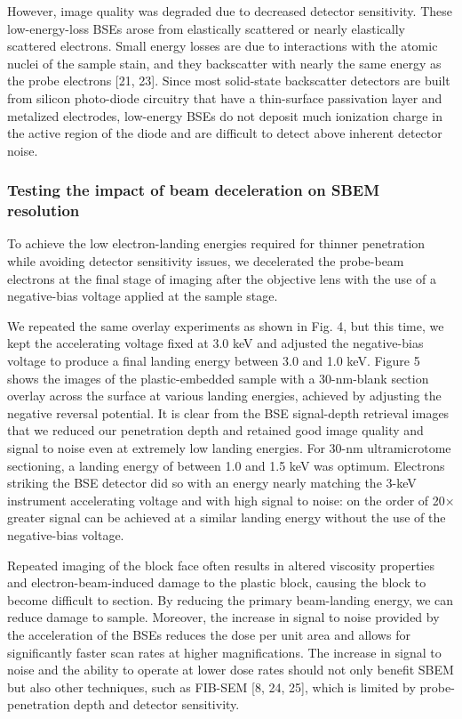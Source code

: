 \documentclass{article}
\begin{document}
However, image quality was degraded due to decreased detector sensitivity. These low-energy-loss BSEs arose from elastically scattered or nearly elastically scattered electrons. Small energy losses are due to interactions with the atomic nuclei of the sample stain, and they backscatter with nearly the same energy as the probe electrons [21, 23]. Since most solid-state backscatter detectors are built from silicon photo-diode circuitry that have a thin-surface passivation layer and metalized electrodes, low-energy BSEs do not deposit much ionization charge in the active region of the diode and are difficult to detect above inherent detector noise.

\subsubsection*{Testing the impact of beam deceleration on SBEM resolution}
To achieve the low electron-landing energies required for thinner penetration while avoiding detector sensitivity issues, we decelerated the probe-beam electrons at the final stage of imaging after the objective lens with the use of a negative-bias voltage applied at the sample stage.

We repeated the same overlay experiments as shown in Fig. 4, but this time, we kept the accelerating voltage fixed at 3.0 keV and adjusted the negative-bias voltage to produce a final landing energy between 3.0 and 1.0 keV. Figure 5 shows the images of the plastic-embedded sample with a 30-nm-blank section overlay across the surface at various landing energies, achieved by adjusting the negative reversal potential. It is clear from the BSE signal-depth retrieval images that we reduced our penetration depth and retained good image quality and signal to noise even at extremely low landing energies. For 30-nm ultramicrotome sectioning, a landing energy of between 1.0 and 1.5 keV was optimum. Electrons striking the BSE detector did so with an energy nearly matching the 3-keV instrument accelerating voltage and with high signal to noise: on the order of 20× greater signal can be achieved at a similar landing energy without the use of the negative-bias voltage.

Repeated imaging of the block face often results in altered viscosity properties and electron-beam-induced damage to the plastic block, causing the block to become difficult to section. By reducing the primary beam-landing energy, we can reduce damage to sample. Moreover, the increase in signal to noise provided by the acceleration of the BSEs reduces the dose per unit area and allows for significantly faster scan rates at higher magnifications. The increase in signal to noise and the ability to operate at lower dose rates should not only benefit SBEM but also other techniques, such as FIB-SEM [8, 24, 25], which is limited by probe-penetration depth and detector sensitivity.
\end{document}
